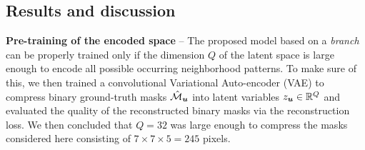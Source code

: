 
\subsection{Results and discussion}

\textbf{Pre-training of the encoded space} -- The proposed model based on a \emph{\encBr branch} can be properly trained only if the dimension $Q$ of the latent space is large enough to encode all possible occurring neighborhood patterns. 
To make sure of this, we then trained a convolutional Variational Auto-encoder (VAE) \cite{kingma2013auto,rezende2014stochastic} to compress binary ground-truth \maskname masks $\hat{\mathcal{M}}_{\bm{u}}$ into latent variables $z_{\bm{u}}\in \mathbb{R}^Q$ and evaluated the quality of the reconstructed binary masks via the reconstruction loss. We then concluded that $Q=32$ was large enough to compress the masks considered here consisting of $7\times 7 \times 5=245$ pixels. 

